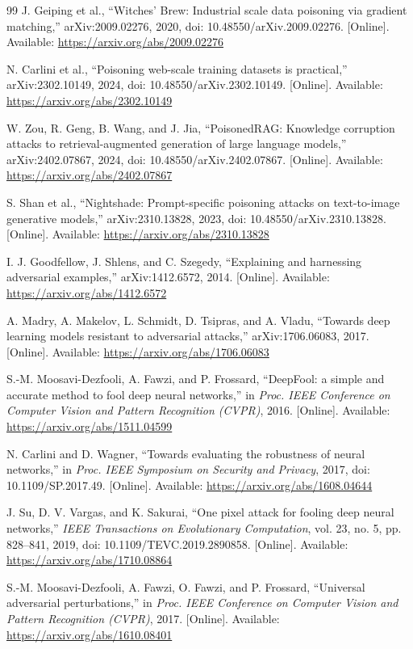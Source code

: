 \documentclass[conference]{IEEEtran}
\begin{document}
\begin{thebibliography}{99}
J. Geiping et al., ``Witches' Brew: Industrial scale data poisoning via gradient matching,'' arXiv:2009.02276, 2020, doi: 10.48550/arXiv.2009.02276. [Online]. Available: \url{https://arxiv.org/abs/2009.02276}

N. Carlini et al., ``Poisoning web-scale training datasets is practical,'' arXiv:2302.10149, 2024, doi: 10.48550/arXiv.2302.10149. [Online]. Available: \url{https://arxiv.org/abs/2302.10149}

W. Zou, R. Geng, B. Wang, and J. Jia, ``PoisonedRAG: Knowledge corruption attacks to retrieval-augmented generation of large language models,'' arXiv:2402.07867, 2024, doi: 10.48550/arXiv.2402.07867. [Online]. Available: \url{https://arxiv.org/abs/2402.07867}

S. Shan et al., ``Nightshade: Prompt-specific poisoning attacks on text-to-image generative models,'' arXiv:2310.13828, 2023, doi: 10.48550/arXiv.2310.13828. [Online]. Available: \url{https://arxiv.org/abs/2310.13828}

I. J. Goodfellow, J. Shlens, and C. Szegedy, ``Explaining and harnessing adversarial examples,'' arXiv:1412.6572, 2014. [Online]. Available: \url{https://arxiv.org/abs/1412.6572}

A. Madry, A. Makelov, L. Schmidt, D. Tsipras, and A. Vladu, ``Towards deep learning models resistant to adversarial attacks,'' arXiv:1706.06083, 2017. [Online]. Available: \url{https://arxiv.org/abs/1706.06083}

S.-M. Moosavi-Dezfooli, A. Fawzi, and P. Frossard, ``DeepFool: a simple and accurate method to fool deep neural networks,'' in \emph{Proc. IEEE Conference on Computer Vision and Pattern Recognition (CVPR)}, 2016. [Online]. Available: \url{https://arxiv.org/abs/1511.04599}

N. Carlini and D. Wagner, ``Towards evaluating the robustness of neural networks,'' in \emph{Proc. IEEE Symposium on Security and Privacy}, 2017, doi: 10.1109/SP.2017.49. [Online]. Available: \url{https://arxiv.org/abs/1608.04644}

J. Su, D. V. Vargas, and K. Sakurai, ``One pixel attack for fooling deep neural networks,'' \emph{IEEE Transactions on Evolutionary Computation}, vol. 23, no. 5, pp. 828--841, 2019, doi: 10.1109/TEVC.2019.2890858. [Online]. Available: \url{https://arxiv.org/abs/1710.08864}

S.-M. Moosavi-Dezfooli, A. Fawzi, O. Fawzi, and P. Frossard, ``Universal adversarial perturbations,'' in \emph{Proc. IEEE Conference on Computer Vision and Pattern Recognition (CVPR)}, 2017. [Online]. Available: \url{https://arxiv.org/abs/1610.08401}


\end{thebibliography}
\end{document}
